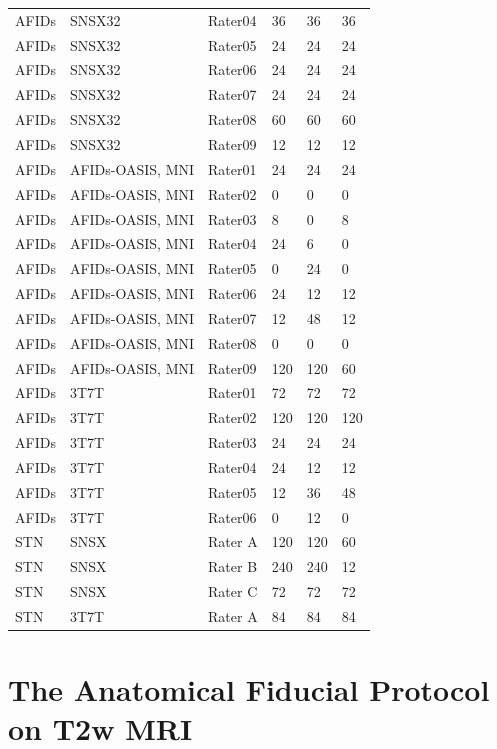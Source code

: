 \begin{table}[htbp]
\begin{tabular}{llllll}
AFIDs & SNSX32 & Rater04 & 36 & 36 & 36 \\
AFIDs & SNSX32 & Rater05 & 24 & 24 & 24 \\
AFIDs & SNSX32 & Rater06 & 24 & 24 & 24 \\
AFIDs & SNSX32 & Rater07 & 24 & 24 & 24 \\
AFIDs & SNSX32 & Rater08 & 60 & 60 & 60 \\
AFIDs & SNSX32 & Rater09 & 12 & 12 & 12 \\
AFIDs & AFIDs-OASIS, MNI & Rater01 & 24 & 24 & 24 \\
AFIDs & AFIDs-OASIS, MNI & Rater02 & 0 & 0 & 0 \\
AFIDs & AFIDs-OASIS, MNI & Rater03 & 8 & 0 & 8 \\
AFIDs & AFIDs-OASIS, MNI & Rater04 & 24 & 6 & 0 \\
AFIDs & AFIDs-OASIS, MNI & Rater05 & 0 & 24 & 0 \\
AFIDs & AFIDs-OASIS, MNI & Rater06 & 24 & 12 & 12 \\
AFIDs & AFIDs-OASIS, MNI & Rater07 & 12 & 48 & 12 \\
AFIDs & AFIDs-OASIS, MNI & Rater08 & 0 & 0 & 0 \\
AFIDs & AFIDs-OASIS, MNI & Rater09 & 120 & 120 & 60 \\
AFIDs & 3T7T & Rater01 & 72 & 72 & 72 \\
AFIDs & 3T7T & Rater02 & 120 & 120 & 120 \\
AFIDs & 3T7T & Rater03 & 24 & 24 & 24 \\
AFIDs & 3T7T & Rater04 & 24 & 12 & 12 \\
AFIDs & 3T7T & Rater05 & 12 & 36 & 48 \\
AFIDs & 3T7T & Rater06 & 0 & 12 & 0 \\
STN & SNSX & Rater A & 120 & 120 & 60 \\
STN & SNSX & Rater B & 240 & 240 & 12 \\
STN & SNSX & Rater C & 72 & 72 & 72 \\
STN & 3T7T & Rater A & 84 & 84 & 84 \\
\bottomrule
\end{tabular}
\label{tab:rater_demographic_data}
\end{table}

\newpage

\section{The Anatomical Fiducial Protocol on T2w MRI}\label{app:AFIDs_T2w}

